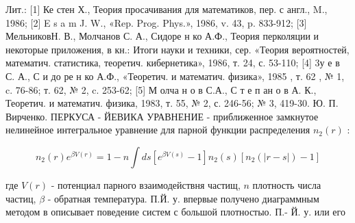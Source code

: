 \documentclass[10pt]{article}
\begin{document}
Лит.: [1] Ке стен Х., Теория просачивания для математиков, пер. с англ., M., 1986; [2] E s a m J. W., «Rep. Prog. Phys.», 1986, v. 43, p. 833-912; [3] МельниковН. В., Молчанов С. А., Сидоре н ко А.Ф., Теория перколяции и некоторые приложения, в кн.: Итоги науки и техники, сер. «Теория вероятностей, математич. статистика, теоретич. кибернетика», 1986, т. 24, с. 53-110; [4] 3у е в С. А., С и до ре н ко А.Ф., «Теоретич. и математич. физика», 1985 , т. 62 , № 1, c. 76-86; т. 62, № 2, c. 253-62; [5] М олча н о в С.А., С т е п ан о в А. К., Теоретич. и математич. физика, 1983, т. 55, № 2, с. 246-56; № 3, 419-30. Ю. П. Вирченко. ПЕРКУСА - ЙЕВИКА УРАВНЕНИЕ - приближенное замкнутое нелинейное интегральное уравнение для парной функции распределения $n_{2}(r)$ :



\[

n_{2}(r) e^{\beta V(r)}=1-n \int d s\left[e^{\beta V(s)}-1\right] n_{2}(s)\left[n_{2}(|r-s|)-1\right]

\]



где $V(r)$ - потенциал парного взаимодействня частищ, $n$ плотность числа частиц, $\beta$ - обратная температура. П.Й. у. впервые получено диаграммным методом в описывает поведение систем с большой плотностыо. П.- Й. у. или его
\end{document}
